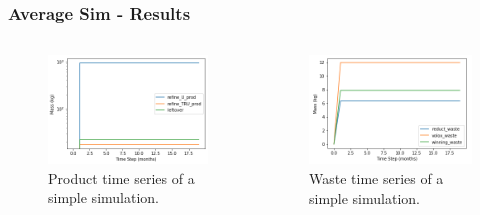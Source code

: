 \begin{frame}
\frametitle{Average Sim - Results}
\begin{columns}
	\begin{column}{.5\textwidth}
		\begin{figure}
			\centering
			\includegraphics[width=\linewidth]{timeseries-prod}
			\caption{Product time series of a simple simulation.}
			\label{fig:timeseries-prod}
		\end{figure}
	\end{column}
	\begin{column}{.5\textwidth}
		\begin{figure}
			\centering
			\includegraphics[width=\linewidth]{timeseries-waste}
			\caption{Waste time series of a simple simulation.}
			\label{fig:timeseries-waste}
		\end{figure}
	\end{column}
\end{columns} 
\end{frame}

